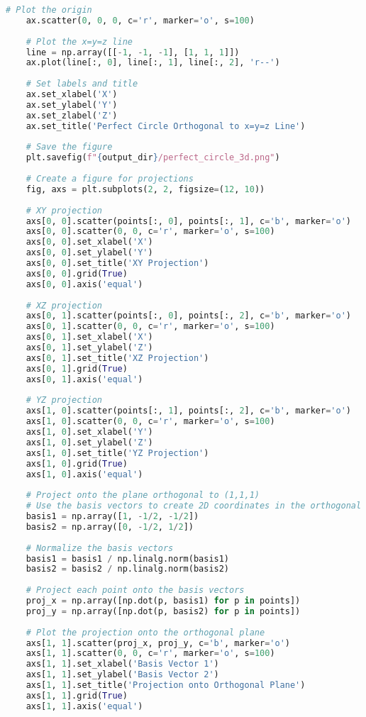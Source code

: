 \begin{lstlisting}[language=Python]
    # Plot the origin
    ax.scatter(0, 0, 0, c='r', marker='o', s=100)
    
    # Plot the x=y=z line
    line = np.array([[-1, -1, -1], [1, 1, 1]])
    ax.plot(line[:, 0], line[:, 1], line[:, 2], 'r--')
    
    # Set labels and title
    ax.set_xlabel('X')
    ax.set_ylabel('Y')
    ax.set_zlabel('Z')
    ax.set_title('Perfect Circle Orthogonal to x=y=z Line')
    
    # Save the figure
    plt.savefig(f"{output_dir}/perfect_circle_3d.png")
    
    # Create a figure for projections
    fig, axs = plt.subplots(2, 2, figsize=(12, 10))
    
    # XY projection
    axs[0, 0].scatter(points[:, 0], points[:, 1], c='b', marker='o')
    axs[0, 0].scatter(0, 0, c='r', marker='o', s=100)
    axs[0, 0].set_xlabel('X')
    axs[0, 0].set_ylabel('Y')
    axs[0, 0].set_title('XY Projection')
    axs[0, 0].grid(True)
    axs[0, 0].axis('equal')
    
    # XZ projection
    axs[0, 1].scatter(points[:, 0], points[:, 2], c='b', marker='o')
    axs[0, 1].scatter(0, 0, c='r', marker='o', s=100)
    axs[0, 1].set_xlabel('X')
    axs[0, 1].set_ylabel('Z')
    axs[0, 1].set_title('XZ Projection')
    axs[0, 1].grid(True)
    axs[0, 1].axis('equal')
    
    # YZ projection
    axs[1, 0].scatter(points[:, 1], points[:, 2], c='b', marker='o')
    axs[1, 0].scatter(0, 0, c='r', marker='o', s=100)
    axs[1, 0].set_xlabel('Y')
    axs[1, 0].set_ylabel('Z')
    axs[1, 0].set_title('YZ Projection')
    axs[1, 0].grid(True)
    axs[1, 0].axis('equal')
    
    # Project onto the plane orthogonal to (1,1,1)
    # Use the basis vectors to create 2D coordinates in the orthogonal plane
    basis1 = np.array([1, -1/2, -1/2])
    basis2 = np.array([0, -1/2, 1/2])
    
    # Normalize the basis vectors
    basis1 = basis1 / np.linalg.norm(basis1)
    basis2 = basis2 / np.linalg.norm(basis2)
    
    # Project each point onto the basis vectors
    proj_x = np.array([np.dot(p, basis1) for p in points])
    proj_y = np.array([np.dot(p, basis2) for p in points])
    
    # Plot the projection onto the orthogonal plane
    axs[1, 1].scatter(proj_x, proj_y, c='b', marker='o')
    axs[1, 1].scatter(0, 0, c='r', marker='o', s=100)
    axs[1, 1].set_xlabel('Basis Vector 1')
    axs[1, 1].set_ylabel('Basis Vector 2')
    axs[1, 1].set_title('Projection onto Orthogonal Plane')
    axs[1, 1].grid(True)
    axs[1, 1].axis('equal')
    

\end{lstlisting}

